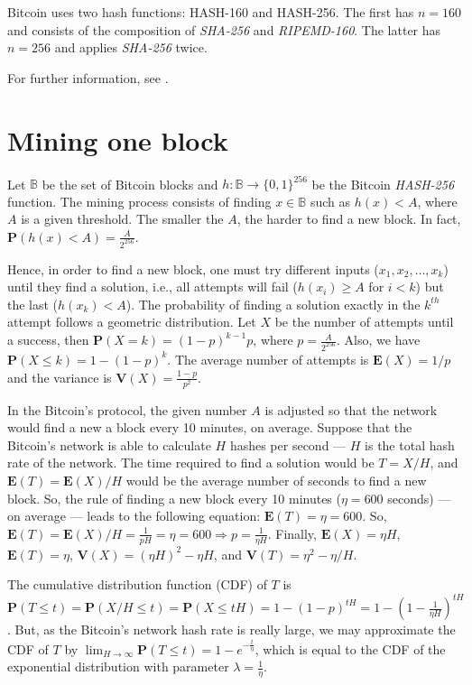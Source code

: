 Bitcoin uses two hash functions: HASH-160 and HASH-256. The first has $n=160$ and consists of the composition of \textit{SHA-256} and \textit{RIPEMD-160}. The latter has $n=256$ and applies \textit{SHA-256} twice.

For further information, see \citet{gilbert2003security, dobbertin1996ripemd}.

\section{Mining one block}

Let $\mathbb{B}$ be the set of Bitcoin blocks and $h: \mathbb{B} \rightarrow \{0, 1\}^{256}$ be the Bitcoin \textit{HASH-256} function. The mining process consists of finding $x \in \mathbb{B}$ such as $h(x) < A$, where $A$ is a given threshold. The smaller the $A$, the harder to find a new block. In fact, $\mathbf{P}(h(x) < A) = \frac{A}{2^{256}}$.

Hence, in order to find a new block, one must try different inputs ($x_1, x_2, \dots, x_k$) until they find a solution, i.e., all attempts will fail ($h(x_i) \geq A$ for $i < k$) but the last ($h(x_k) < A$). The probability of finding a solution exactly in the $k^{th}$ attempt follows a geometric distribution. Let $X$ be the number of attempts until a success, then $\mathbf{P}(X = k) = (1-p)^{k-1} p$, where $p = \frac{A}{2^{256}}$. Also, we have $\mathbf{P}(X \leq k) = 1 - (1-p)^k$. The average number of attempts is $\mathbf{E}(X) = 1/p$ and the variance is $\mathbf{V}(X) = \frac{1-p}{p^2}$.

In the Bitcoin's protocol, the given number $A$ is adjusted so that the network would find a new a block every 10 minutes, on average. Suppose that the Bitcoin's network is able to calculate $H$ hashes per second --- $H$ is the total hash rate of the network. The time required to find a solution would be $T=X/H$, and $\mathbf{E}(T) = \mathbf{E}(X)/H$ would be the average number of seconds to find a new block. So, the rule of finding a new block every 10 minutes ($\eta = 600$ seconds) --- on average --- leads to the following equation: $\mathbf{E}(T) = \eta = 600$. So, $\mathbf{E}(T) = \mathbf{E}(X)/H = \frac{1}{pH} = \eta = 600 \Rightarrow p = \frac{1}{\eta H}$. Finally, $\mathbf{E}(X) = \eta H$, $\mathbf{E}(T) = \eta$, $\mathbf{V}(X) = (\eta H)^2 - \eta H$, and $\mathbf{V}(T) = \eta^2 - \eta/H$.

The cumulative distribution function (CDF) of $T$ is $\mathbf{P}(T \leq t) = \mathbf{P}(X/H \leq t) = \mathbf{P}(X \leq tH) = 1 - (1-p)^{tH} = 1 - \left( 1-\frac{1}{\eta H} \right)^{tH}$. But, as the Bitcoin's network hash rate is really large, we may approximate the CDF of $T$ by $\lim_{H \rightarrow \infty} \mathbf{P}(T \leq t) = 1 - e^{-\frac{t}{\eta}}$, which is equal to the CDF of the exponential distribution with parameter $\lambda = \frac{1}{\eta}$.

